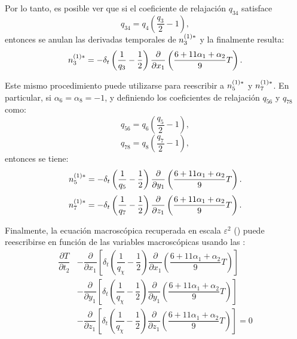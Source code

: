 Por lo tanto, es posible ver que si el coeficiente de relajaci\'on $q_{34}$ satisface
\begin{equation}
	q_{34} = q_4 \left( \dfrac{q_3}{2} - 1 \right),
\end{equation}
entonces se anulan las derivadas temporales de $n_{3}^{(1)*}$ y la  finalmente resulta:
\begin{equation}
	n_{3}^{(1)*} = -\delta_t \left( \dfrac{1}{q_3} - \dfrac{1}{2} \right) \dfrac{\partial}{\partial x_1} \left( \dfrac{6 + 11\alpha_1+\alpha_2}{9}T \right).
	\label{eq:n3star_macro 3d}
\end{equation}

Este mismo procedimiento puede utilizarse para reescribir a $n_{5}^{(1)*}$ y $n_{7}^{(1)*}$. En particular, si $\alpha_6 = \alpha_8 = -1$, y definiendo los coeficientes de relajaci\'on $q_{56}$ y $q_{78}$ como:
\begin{equation}
	q_{56} = q_6 \left( \dfrac{q_{5}}{2} - 1 \right),
\end{equation}
\begin{equation}
	q_{78} = q_8 \left( \dfrac{q_{7}}{2} - 1 \right),
\end{equation}
entonces se tiene:
\begin{equation}
	n_{5}^{(1)*} = -\delta_t \left( \dfrac{1}{q_5} - \dfrac{1}{2} \right) \dfrac{\partial}{\partial y_1} \left( \dfrac{6 + 11\alpha_1+\alpha_2}{9}T \right).
	\label{eq:n5star_macro 3d}
\end{equation}
\begin{equation}
	n_{7}^{(1)*} = -\delta_t \left( \dfrac{1}{q_7} - \dfrac{1}{2} \right) \dfrac{\partial}{\partial z_1} \left( \dfrac{6 + 11\alpha_1+\alpha_2}{9}T \right).
	\label{eq:n7star_macro 3d}
\end{equation}

Finalmente, la ecuaci\'on macrosc\'opica recuperada en escala $\varepsilon^2$ () puede reescribirse en funci\'on de las variables macrosc\'opicas usando las :
\begin{equation}
	\begin{aligned}
		\dfrac{\partial T}{\partial t_2} 
		&- \dfrac{\partial}{\partial x_1}\left[ \delta_t \left( \dfrac{1}{q_{\chi}} - \dfrac{1}{2} \right) \dfrac{\partial}{\partial x_1} \left( \dfrac{6 + 11\alpha_1+\alpha_2}{9}T \right) \right] \\
		&- \dfrac{\partial}{\partial y_1}\left[ \delta_t \left( \dfrac{1}{q_{\chi}} - \dfrac{1}{2} \right) \dfrac{\partial}{\partial y_1} \left( \dfrac{6 + 11\alpha_1+\alpha_2}{9}T \right) \right] \\
		&- \dfrac{\partial}{\partial z_1}\left[ \delta_t \left( \dfrac{1}{q_{\chi}} - \dfrac{1}{2} \right) \dfrac{\partial}{\partial z_1} \left( \dfrac{6 + 11\alpha_1+\alpha_2}{9}T \right) \right] = 0
	\end{aligned}
\end{equation}

